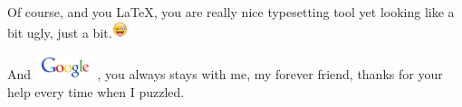 \documentclass{article}
\begin{document}
\begin{center}
  Of course, and you \LaTeX{}, you are really nice typesetting tool yet looking like a bit
  ugly,  just a bit.\includegraphics[height=1.3em]{grimace}

  And \includegraphics[height=2em]{google}, you always stays with me, my forever friend,
  thanks for your help every time when I puzzled.
\end{center}
\end{document}
